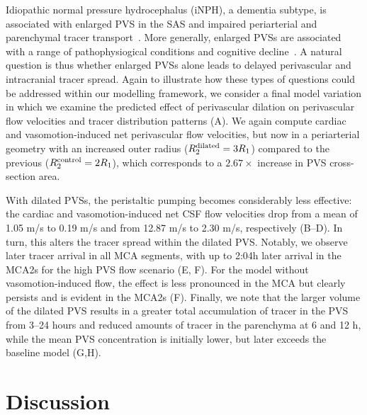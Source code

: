 \documentclass[fleqn,10pt]{wlscirep}
\begin{document}
Idiopathic normal pressure hydrocephalus (iNPH), a dementia subtype,
is associated with enlarged PVS in the SAS and impaired periarterial
and parenchymal tracer transport~\cite{eide2024functional}. More
generally, enlarged PVSs are associated with a range of
pathophysiogical conditions and cognitive
decline~\cite{bown2022physiology}. A natural question is thus whether
enlarged PVSs alone leads to delayed perivascular and intracranial
tracer spread. Again to illustrate how these types of questions could
be addressed within our modelling framework, we consider a final model
variation in which we examine the predicted effect of perivascular
dilation on perivascular flow velocities and tracer distribution
patterns (A). We again compute cardiac and
vasomotion-induced net perivascular flow velocities, but now in a
periarterial geometry with an increased outer radius ($R^{\rm
  dilated}_2 = 3 R_1$) compared to the previous ($R^{\rm control}_2 =
2 R_1$), which corresponds to a $2.67 \times$ increase in PVS
cross-section area.

With dilated PVSs, the peristaltic pumping becomes considerably
less effective: the cardiac and vasomotion-induced net CSF flow
velocities drop from a mean of 1.05 \textmu m/s to 0.19 \textmu m/s
and from 12.87 \textmu m/s to 2.30 \textmu m/s, respectively
(B--D). In turn, this alters the tracer spread within the dilated
PVS. Notably, we observe later tracer arrival in all MCA segments,
with up to 2:04h later arrival in the MCA2s for the high PVS flow
scenario (E, F). For the model without vasomotion-induced flow, the effect is less
pronounced in the MCA but clearly persists and is evident in the MCA2s
(F). Finally, we note that the larger volume of
the dilated PVS results in a greater total accumulation of tracer in
the PVS from 3--24 hours and reduced amounts of tracer in the
parenchyma at 6 and 12 h, while the mean PVS concentration is
initially lower, but later exceeds the baseline model
(G,H).



\section*{Discussion}
\end{document}
